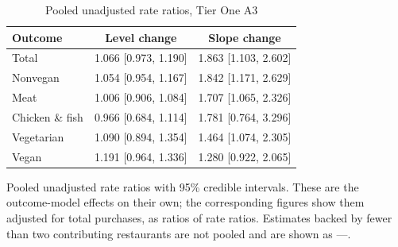 \begin{table}[H]
\centering
\caption{Pooled unadjusted rate ratios, Tier One A3}
\label{tab:rr_t1_a3}
\begin{tabular}{lcc}
\toprule
Outcome & Level change & Slope change \\
\midrule
Total & 1.066 [0.973, 1.190] & 1.863 [1.103, 2.602] \\
Nonvegan & 1.054 [0.954, 1.167] & 1.842 [1.171, 2.629] \\
Meat & 1.006 [0.906, 1.084] & 1.707 [1.065, 2.326] \\
Chicken \& fish & 0.966 [0.684, 1.114] & 1.781 [0.764, 3.296] \\
Vegetarian & 1.090 [0.894, 1.354] & 1.464 [1.074, 2.305] \\
Vegan & 1.191 [0.964, 1.336] & 1.280 [0.922, 2.065] \\
\bottomrule
\end{tabular}
\par\smallskip\footnotesize Pooled unadjusted rate ratios with 95\% credible intervals. These are the outcome-model effects on their own; the corresponding figures show them adjusted for total purchases, as ratios of rate ratios. Estimates backed by fewer than two contributing restaurants are not pooled and are shown as ---.
\end{table}
